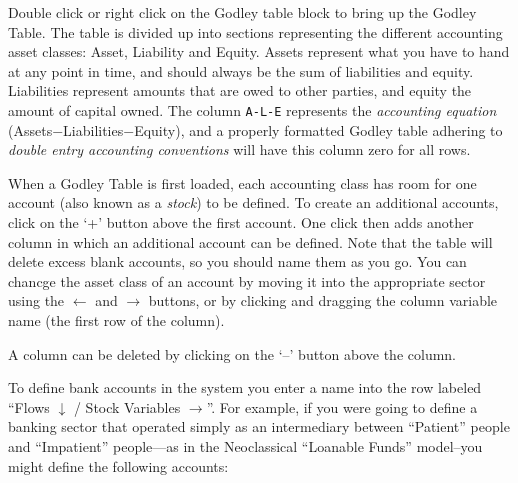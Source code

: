 Double click or right click on the Godley table block to bring up
the Godley Table. The table is divided up into sections representing
the different accounting asset classes: Asset, Liability and Equity.
Assets represent what you have to hand at any point in time, and should
always be the sum of liabilities and equity. Liabilities represent
amounts that are owed to other parties, and equity the amount of capital
owned. The column \verb+A-L-E+ represents the {\em accounting equation}
(Assets$-$Liabilities$-$Equity), and a properly formatted Godley
table adhering to {\em double entry accounting conventions} will
have this column zero for all rows.

When a Godley Table is first loaded, each accounting class has room
for one account (also known as a {\em stock}) to be defined. To
create an additional accounts, click on the `+' button above the first
account. One click then adds another column in which an additional
account can be defined. Note that the table will delete excess blank
accounts, so you should name them as you go. You can chancge the asset
class of an account by moving it into the appropriate sector using
the $\leftarrow$ and $\rightarrow$ buttons, or by clicking and dragging
the column variable name (the first row of the column).

\begin{center}
\par\end{center}

A column can be deleted by clicking on the `--' button above the
column.

To define bank accounts in the system you enter a name into the row
labeled ``Flows $\downarrow$ / Stock Variables $\rightarrow$''.
For example, if you were going to define a banking sector that operated
simply as an intermediary between ``Patient'' people and ``Impatient''
people---as in the Neoclassical ``Loanable Funds'' model--you
might define the following accounts:

